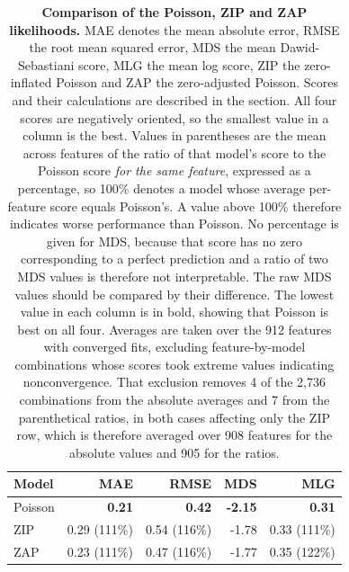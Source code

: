 \documentclass[10pt,letterpaper]{article}
\begin{document}
\begin{table}[!ht]
\centering
\caption{{\bf Comparison of the Poisson, ZIP and ZAP likelihoods.} MAE denotes the mean absolute error, RMSE the root mean squared error, MDS the mean Dawid-Sebastiani score, MLG the mean log score, ZIP the zero-inflated Poisson and ZAP the zero-adjusted Poisson. Scores and their calculations are described in the  section. All four scores are negatively oriented, so the smallest value in a column is the best. Values in parentheses are the mean across features of the ratio of that model's score to the Poisson score \emph{for the same feature}, expressed as a percentage, so 100\% denotes a model whose average per-feature score equals Poisson's.  A value above 100\% therefore indicates worse performance than Poisson. No percentage is given for MDS, because that score has no zero corresponding to a perfect prediction and a ratio of two MDS values is therefore not interpretable. The raw MDS values should be compared by their difference. The lowest value in each column is in bold, showing that Poisson is best on all four. Averages are taken over the 912 features with converged fits, excluding feature-by-model combinations whose scores took extreme values indicating nonconvergence. That exclusion removes 4 of the 2,736 combinations from the absolute averages and 7 from the parenthetical ratios, in both cases affecting only the ZIP row, which is therefore averaged over 908 features for the absolute values and 905 for the ratios.}
\label{tab:lik-comp}
\begin{tabular}{|l|rrrr|}
  \hline
  Model & MAE & RMSE & MDS & MLG \\
  \hline
Poisson & \textbf{0.21} & \textbf{0.42} & \textbf{-2.15} & \textbf{0.31} \\
ZIP & 0.29 (111\%) & 0.54 (116\%) & -1.78 & 0.33 (111\%) \\
ZAP & 0.23 (111\%)& 0.47 (116\%)& -1.77 & 0.35 (122\%)\\
   \hline
\end{tabular}
\end{table}
\end{document}

